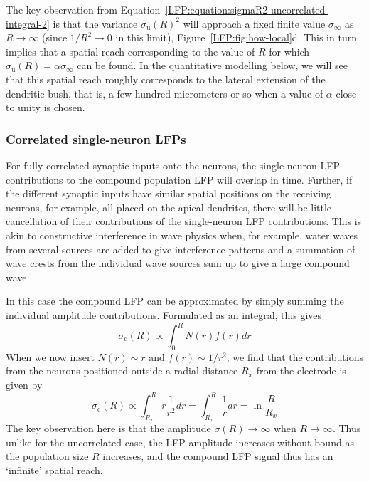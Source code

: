 The key observation from Equation~\ref{LFP:equation:sigmaR2-uncorrelated-integral-2} is that the variance $\sigma_\text{u}(R)^2$ 
will approach a fixed finite value $\sigma_\infty$ as $R \rightarrow \infty$ (since $1/R^2 \rightarrow 0$ in this limit), Figure~\ref{LFP:fig:how-local}d.
This in turn implies that a spatial reach corresponding to the value of $R$ for which $\sigma_\text{u}(R)=\alpha \sigma_\infty$ can be found.
In the quantitative modelling below, we will see that this spatial reach roughly corresponds to the lateral extension of the dendritic bush, that is, a few hundred micrometers or so when a value of $\alpha$ close to unity is chosen.

\subsubsection{Correlated single-neuron LFPs}

For fully correlated synaptic inputs onto the neurons, the single-neuron LFP contributions to the compound population LFP will overlap in time.
Further, if the different synaptic inputs have similar spatial positions on the receiving neurons, for example, all placed on the apical dendrites,  there will be little cancellation of their contributions of the single-neuron LFP contributions. 
This is akin to constructive interference in wave physics when, for example, water waves from several sources are added to give interference patterns and a summation of wave crests from the individual wave sources sum up to give a large compound wave.

In this case the compound LFP can be 
approximated by simply summing the individual amplitude contributions. Formulated as an integral, this gives
\begin{equation}
\sigma_\text{c}(R) \propto \int_0^R N(r) f(r) dr 
\label{LFP:equation:sigmaR-correlated-integral}
\end{equation}
When we now insert $N(r) \sim r$ and $f(r) \sim 1/r^2$, we find that the contributions from the neurons
positioned outside a radial distance $R_x$ from the electrode is given by
\begin{equation}
\sigma_\text{c}(R) \propto \int_{R_x}^R r \frac{1}{r^2} dr =  \int_{R_x}^R \frac{1}{r} dr = \ln \frac{R}{R_x} 
\label{LFP:equation:sigmaR-correlated-integral-2}
\end{equation}
The key observation here is that the amplitude $\sigma (R) \rightarrow \infty$ when $R \rightarrow \infty$.
Thus unlike for the uncorrelated case, the LFP amplitude increases without bound as the population size $R$ increases, 
and the compound LFP signal thus has an `infinite' spatial reach.

